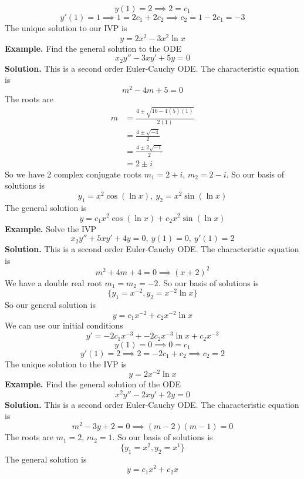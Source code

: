 \documentclass[openany]{report}
\begin{document}
\[y(1) = 2 \implies 2 = c_1\]
\[y'(1) = 1 \implies 1 = 2c_1 + 2c_2 \implies c_2 = 1 - 2c_1 = -3\]
The unique solution to our IVP is
\[y = 2x^2 - 3x^2\ln x\]
\textbf{Example.} Find the general solution to the ODE 
\[x_2y'' - 3xy' + 5y = 0\]
\textbf{Solution.} This is a second order Euler-Cauchy ODE. The characteristic equation is
\[m^2 - 4m + 5 = 0\]
The roots are 
\begin{align*}
    m &= \frac{4 \pm \sqrt{16 - 4(5)(1)}}{2(1)}\\
    &= \frac{4 \pm \sqrt{-4}}{2}\\
    &= \frac{4 \pm 2\sqrt{-1}}{2}\\
    &= 2 \pm i 
\end{align*}
So we have 2 complex conjugate roots $m_1 = 2 + i$, $m_2 = 2 - i$. So our basis of solutions is
\[y_1 = x^2\cos(\ln x), \ y_2 = x^2\sin(\ln x)\]
The general solution is 
\[y = c_1x^2\cos(\ln x) + c_2x^2\sin(\ln x)\]
\textbf{Example.} Solve the IVP
\[x_2y'' + 5xy' + 4y = 0, \ y(1) = 0, \ y'(1) = 2\]
\textbf{Solution.} This is a second order Euler-Cauchy ODE. The characteristic equation is
\[m^2 + 4m + 4 = 0 \implies (x+2)^2\]
We have a double real root $m_1 = m_2 = -2$. So our basis of solutions is
\[\{y_1 = x^{-2}, y_2 = x^{-2}\ln x\}\]
So our general solution is 
\[y = c_1x^{-2} + c_2x^{-2}\ln x\]
We can use our initial conditions
\[y' = -2c_1x^{-3} + -2c_2x^{-3}\ln x + c_2x^{-3}\]
\[y(1) = 0 \implies 0 = c_1\]
\[y'(1) = 2 \implies 2 = -2c_1 + c_2 \implies c_2 = 2\]
The unique solution to the IVP is 
\[y = 2x^{-2}\ln x \]
\textbf{Example.} Find the general solution of the ODE 
\[x^2y'' - 2xy' + 2y = 0\]
\textbf{Solution.} This is a second order Euler-Cauchy ODE. The characteristic equation is
\[m^2 - 3y + 2 = 0 \implies (m- 2)(m-1) = 0\]
The roots are $m_1 = 2$, $m_2 = 1$. So our basis of solutions is
\[\{y_1 = x^2, y_2 = x^1\}\]
The general solution is
\[y = c_1x^2 + c_2x\]
\end{document}
